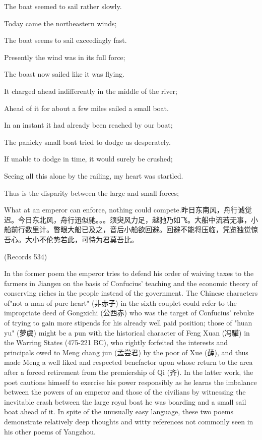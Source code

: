 The boat seemed to sail rather slowly.

Today came the northeastern winds;

The boat seems to sail exceedingly fast.

Presently the wind was in its full force;

The boast now sailed like it was flying.

It charged ahead indifferently in the middle of the river;

Ahead of it for about a few miles sailed a small boat.

In an instant it had already been reached by our boat;

The panicky small boat tried to dodge us desperately.

If unable to dodge in time, it would surely be crushed;

Seeing all this alone by the railing, my heart was startled.

Thus is the disparity between the large and small forces;

What at an emperor can enforce, nothing could compete.昨日东南风，舟行诚觉迟。今日东北风，舟行迅似驰。。。须臾风力足，越驰乃如飞。大船中流若无事，小船前行数里计。瞥眼大船已及之，音后小船欲回避。回避不能将压临，凭览独觉惊吾心。大小不伦势若此，可恃为君莫吾比。

(Records 534)


\noindent In the former poem the emperor tries to defend his order of waiving taxes to the farmers in Jiangsu on the basis of Confucius' teaching and the economic theory of conserving riches in the people instead of the government. The Chinese characters of"not a man of pure heart" (非赤子) in the sixth couplet could refer to the impropriate deed of Gongxichi (公西赤) who was the target of Confucius' rebuke of trying to gain more stipends for his already well paid position; those of "huan yu" (萝虞) might be a pun with the historical character of Feng Xuan (冯驩) in the Warring States (475-221 BC), who rightly forfeited the interests and principals owed to Meng chang jun (孟尝君) by the poor of Xue (薛), and thus made Meng a well liked and respected benefactor upon whose return to the area after a forced retirement from the premiership of Qi (齐). In the latter work, the poet cautions himself to exercise his power responsibly as he learns the imbalance between the powers of an emperor and those of the civilians by witnessing the inevitable crash between the large royal boat he was boarding and a small sail boat ahead of it. In spite of the unusually easy language, these two poems demonstrate relatively deep thoughts and witty references not commonly seen in his other poems of Yangzhou.

